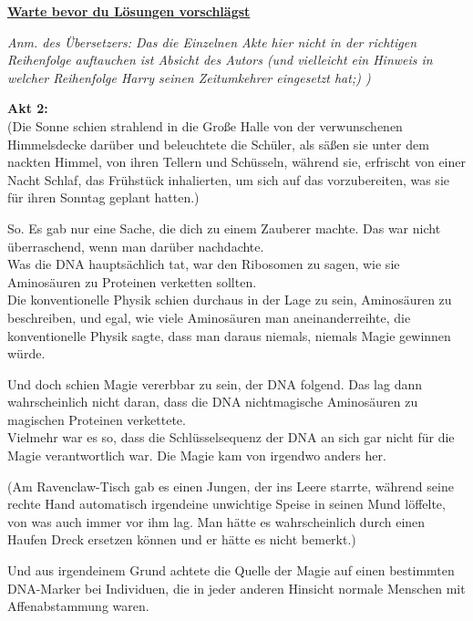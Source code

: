 

\hypertarget{warte-bevor-du-luxf6sungen-vorschluxe4gst}{%

\textbf{\uline{Warte bevor du Lösungen vorschlägst}}

\emph{Anm. des Übersetzers: Das die Einzelnen Akte hier nicht in der richtigen Reihenfolge auftauchen ist Absicht des Autors (und vielleicht ein Hinweis in welcher Reihenfolge Harry seinen Zeitumkehrer eingesetzt hat;) )}

\textbf{Akt 2:}\\ (Die Sonne schien strahlend in die Große Halle von der verwunschenen Himmelsdecke darüber und beleuchtete die Schüler, als säßen sie unter dem nackten Himmel, von ihren Tellern und Schüsseln, während sie, erfrischt von einer Nacht Schlaf, das Frühstück inhalierten, um sich auf das vorzubereiten, was sie für ihren Sonntag geplant hatten.)

So. Es gab nur eine Sache, die dich zu einem Zauberer machte. Das war nicht überraschend, wenn man darüber nachdachte.\\ Was die DNA hauptsächlich tat, war den Ribosomen zu sagen, wie sie Aminosäuren zu Proteinen verketten sollten.\\ Die konventionelle Physik schien durchaus in der Lage zu sein, Aminosäuren zu beschreiben, und egal, wie viele Aminosäuren man aneinanderreihte, die konventionelle Physik sagte, dass man daraus niemals, niemals Magie gewinnen würde.

Und doch schien Magie vererbbar zu sein, der DNA folgend. Das lag dann wahrscheinlich nicht daran, dass die DNA nichtmagische Aminosäuren zu magischen Proteinen verkettete.\\ Vielmehr war es so, dass die Schlüsselsequenz der DNA an sich gar nicht für die Magie verantwortlich war. Die Magie kam von irgendwo anders her.

(Am Ravenclaw-Tisch gab es einen Jungen, der ins Leere starrte, während seine rechte Hand automatisch irgendeine unwichtige Speise in seinen Mund löffelte, von was auch immer vor ihm lag. Man hätte es wahrscheinlich durch einen Haufen Dreck ersetzen können und er hätte es nicht bemerkt.)

Und aus irgendeinem Grund achtete die Quelle der Magie auf einen bestimmten DNA-Marker bei Individuen, die in jeder anderen Hinsicht normale Menschen mit Affenabstammung waren.

}
